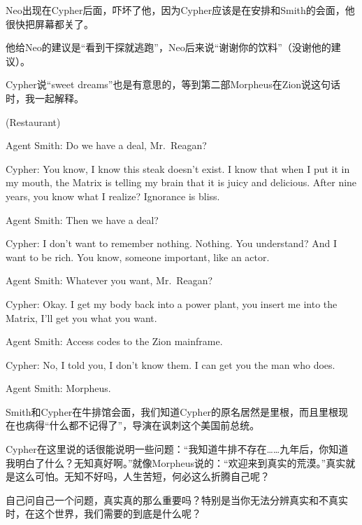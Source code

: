\documentclass{ctexart}
\newenvironment{myquote}{\color{green} \setlength{\leftskip}{6em} \setlength{\rightskip}{4em} \setlength{\parindent}{-2em}}{\par}
\begin{document}
Neo出现在Cypher后面，吓坏了他，因为Cypher应该是在安排和Smith的会面，他很快把屏幕都关了。

他给Neo的建议是“看到干探就逃跑”，Neo后来说“谢谢你的饮料”（没谢他的建议）。

Cypher说“sweet dreams”也是有意思的，等到第二部Morpheus在Zion说这句话时，我一起解释。

\begin{myquote}
(Restaurant)

Agent Smith: Do we have a deal, Mr.~Reagan?

Cypher: You know, I know this steak doesn't exist. I know that when I put it in my mouth, the Matrix is telling my brain that it is juicy and delicious. After nine years, you know what I realize? Ignorance is bliss.

Agent Smith: Then we have a deal?

Cypher: I don't want to remember nothing. Nothing. You understand? And I want to be rich. You know, someone important, like an actor.

Agent Smith: Whatever you want, Mr.~Reagan?

Cypher: Okay. I get my body back into a power plant, you insert me into the Matrix, I'll get you what you want.

Agent Smith: Access codes to the Zion mainframe.

Cypher: No, I told you, I don't know them. I can get you the man who does.

Agent Smith: Morpheus.
\end{myquote}

Smith和Cypher在牛排馆会面，我们知道Cypher的原名居然是里根，而且里根现在也病得“什么都不记得了”，导演在讽刺这个美国前总统。

Cypher在这里说的话很能说明一些问题：“我知道牛排不存在……九年后，你知道我明白了什么？无知真好啊。”就像Morpheus说的：“欢迎来到真实的荒漠。”真实就是这么可怕。无知不好吗，人生苦短，何必这么折腾自己呢？

自己问自己一个问题，真实真的那么重要吗？特别是当你无法分辨真实和不真实时，在这个世界，我们需要的到底是什么呢？
\end{document}
